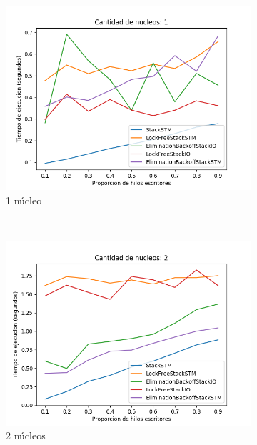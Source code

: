 \clearpage
\begin{figure}[!h]
    \centering
    \begin{subfigure}[b]{0.49\textwidth}
        \includegraphics[width=\textwidth]{images/pushPercentages/plots/1.png}
        \caption{1 núcleo}
        \label{subfig:pushPercentages-1core}
    \end{subfigure}
    ~
    \begin{subfigure}[b]{0.49\textwidth}
        \includegraphics[width=\textwidth]{images/pushPercentages/plots/2.png}
        \caption{2 núcleos}
        \label{subfig:pushPercentages-2core}
    \end{subfigure}
    ~
    \begin{subfigure}[b]{0.5\textwidth}

\end{subfigure}
\end{figure}
